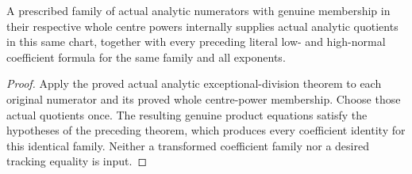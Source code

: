 \begin{theorem}
\label{hir:actual-coefficient-controlled-family-quotients}
\leanok
A prescribed family of actual analytic numerators with genuine membership in their respective whole centre powers internally supplies actual analytic quotients in this same chart, together with every preceding literal low- and high-normal coefficient formula for the same family and all exponents.
\end{theorem}
\begin{proof}
Apply the proved actual analytic exceptional-division theorem to each original numerator and its proved whole centre-power membership. Choose those actual quotients once. The resulting genuine product equations satisfy the hypotheses of the preceding theorem, which produces every coefficient identity for this identical family. Neither a transformed coefficient family nor a desired tracking equality is input.
\end{proof}

